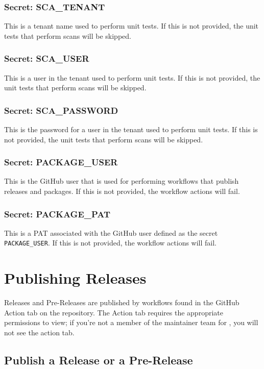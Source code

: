 \subsubsection{Secret: SCA\_TENANT}
This is a \cxsca tenant name used to perform unit tests.  If this is not provided,
the unit tests that perform scans will be skipped.

\subsubsection{Secret: SCA\_USER}
This is a user in the \cxsca tenant used to perform unit tests.  If this is not provided,
the unit tests that perform scans will be skipped.

\subsubsection{Secret: SCA\_PASSWORD}
This is the password for a user in the \cxsca tenant used to perform unit tests.  
If this is not provided,
the unit tests that perform scans will be skipped.

\subsubsection{Secret: PACKAGE\_USER}
This is the GitHub user that is used for performing workflows that
publish releases and packages.  If this is not provided, the workflow actions
will fail.

\subsubsection{Secret: PACKAGE\_PAT}

This is a PAT associated with the GitHub user defined as the secret
\texttt{PACKAGE\_USER}. If this is not provided, the workflow actions
will fail.

\section{Publishing Releases}

Releases and Pre-Releases are published by workflows found in the GitHub Action
tab on the repository.  The Action tab requires the appropriate permissions
to view; if you're not a member of the maintainer team for \cxtoolkit, you will
not see the action tab.

\subsection{Publish a Release or a Pre-Release}

